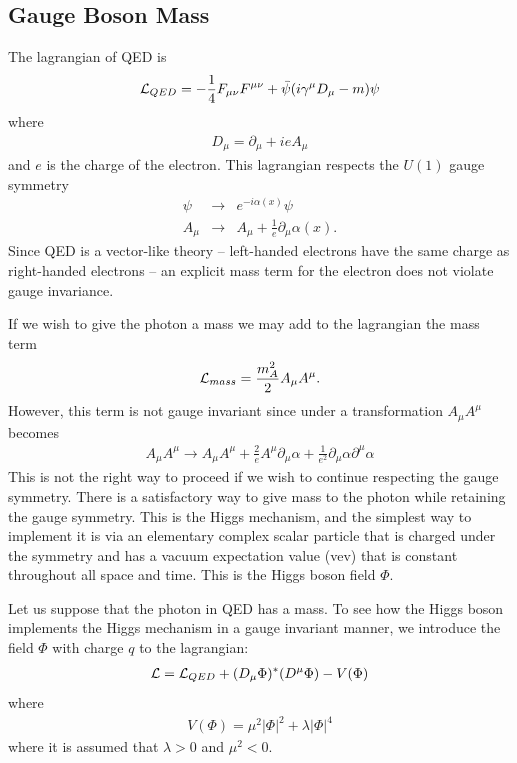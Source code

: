 \documentclass[12pt]{article}
\def\beq{\begin{eqnarray}}
\def\eeq{\end{eqnarray}}
\def\bea{\begin{eqnarray}}
\def\Dslash{\gamma^\mu D_\mu}
\begin{document}
\noindent
\subsection{Gauge Boson Mass}

The lagrangian of QED is
\beq
{\cal L}_{QED}=-\frac{1}{4}F_{\mu\nu}F^{\mu\nu}+\bar \psi (i\Dslash -m)\psi
\eeq
where 
\beq
D_\mu=\partial_\mu +ieA_\mu
\eeq
and $e$ is the charge of the electron.
This lagrangian respects the $U(1)$ gauge symmetry
\bea
\psi & \to & e^{-i\alpha(x)}\psi \\
A_\mu & \to & A_\mu+\frac{1}{e}\partial_\mu \alpha(x).
\eeq
Since QED is a vector-like theory -- left-handed electrons have the same charge as right-handed electrons --  an explicit mass term for the electron does not violate gauge invariance. 

If we wish to give the photon a mass we may add to the lagrangian the mass term
\beq
{\cal L}_{mass}=\frac{m_A^2}{2}A_\mu A^\mu .
\eeq
However, this term is not gauge invariant since under a transformation $A_\mu A^\mu$ becomes
\beq
A_\mu A^\mu\to A_\mu A^\mu+\frac{2}{e}A^\mu\partial_\mu\alpha+\frac{1}{e^2}\partial_\mu \alpha\partial^\mu\alpha
\eeq
This is not the right way to proceed if we wish to continue respecting the gauge symmetry. 
There is a satisfactory way to give mass to the photon while retaining the gauge symmetry. This is the Higgs mechanism, and the simplest way to implement it is via an elementary complex scalar particle that is charged under the symmetry and has a vacuum expectation value (vev) that is constant throughout all space and time.  This is the Higgs boson field $\Phi$.

Let us suppose that the photon in QED has a mass. To see how the Higgs boson implements the Higgs mechanism in a gauge invariant manner,  we 
introduce the field $\Phi$ with charge $q$  to the lagrangian:
\beq
{\cal L}={\cal L}_{QED}+(D_\mu\Phi)^*(D^\mu \Phi)-V(\Phi)
\eeq
where 
\beq
V(\Phi)=\mu^2|\Phi|^2+\lambda |\Phi|^4
\eeq
where it is assumed that $\lambda>0$ and $\mu^2<0$.  
\end{document}

